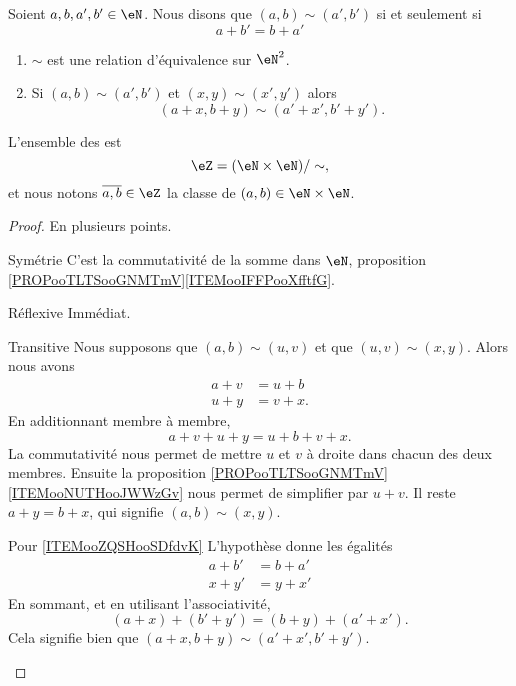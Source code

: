 \begin{propositionDef}     \label{PROPooFIKUooVHlvTt}
	Soient \( a,b,a',b'\in \eN\). Nous disons que \( (a,b)\sim(a',b')\) si et seulement si
	\begin{equation}
		a+b'=b+a'
	\end{equation}
	\begin{enumerate}
		\item
		      \( \sim\) est une relation d'équivalence sur \( \eN^2\).
		\item       \label{ITEMooZQSHooSDfdvK}
		      Si \( (a,b)\sim (a',b')\) et \( (x,y)\sim (x',y')\) alors
		      \begin{equation}
			      (a+x,b+y)\sim(a'+x',b'+y').
		      \end{equation}
	\end{enumerate}
	L'ensemble des  est
	\begin{equation}
		\eZ=(\eN\times \eN)/\sim,
	\end{equation}
	et nous notons \( \overline{ a,b }\in \eZ\) la classe de \( (a,b)\in \eN\times \eN\).
\end{propositionDef}

\begin{proof}
	En plusieurs points.
	\begin{subproof}
		\item[Symétrie]
		C'est la commutativité de la somme dans \( \eN\), proposition \ref{PROPooTLTSooGNMTmV}\ref{ITEMooIFFPooXfftfG}.
		\item[Réflexive]
		Immédiat.
		\item[Transitive]
		Nous supposons que \( (a,b)\sim(u,v)\) et que \( (u,v)\sim(x,y)\). Alors nous avons
		\begin{subequations}
			\begin{align}
				a+v & =u+b  \\
				u+y & =v+x.
			\end{align}
		\end{subequations}
		En additionnant membre à membre,
		\begin{equation}
			a+v+u+y=u+b+v+x.
		\end{equation}
		La commutativité nous permet de mettre \( u\) et \( v\) à droite dans chacun des deux membres. Ensuite la proposition \ref{PROPooTLTSooGNMTmV}\ref{ITEMooNUTHooJWWzGv} nous permet de simplifier par \( u+v\). Il reste \( a+y=b+x\), qui signifie \( (a,b)\sim(x,y)\).
		\item[Pour \ref{ITEMooZQSHooSDfdvK}]
		L'hypothèse donne les égalités
		\begin{subequations}
			\begin{align}
				a+b' & =b+a' \\
				x+y' & =y+x'
			\end{align}
		\end{subequations}
		En sommant, et en utilisant l'associativité,
		\begin{equation}
			(a+x)+(b'+y')=(b+y)+(a'+x').
		\end{equation}
		Cela signifie bien que \( (a+x,b+y)\sim(a'+x',b'+y')\).
	\end{subproof}
\end{proof}

